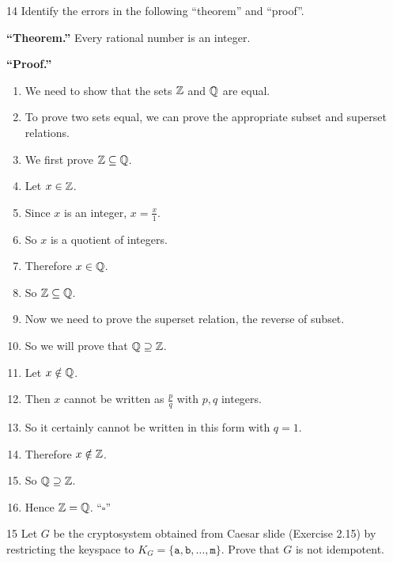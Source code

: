 \begin{exercise}{14}
    Identify the errors in the following ``theorem'' and ``proof''.

    \textbf{``Theorem.''} Every rational number is an integer.

    \textbf{``Proof.''}
    \begin{enumerate}
        \item We need to show that the sets $\mathbb{Z}$ and $\mathbb{Q}$ are equal.
        \item To prove two sets equal, we can prove the appropriate subset and
              superset relations.
        \item We first prove $\mathbb{Z}\subseteq\mathbb{Q}$.
        \item Let $x\in\mathbb{Z}$.
        \item Since $x$ is an integer, $x=\frac x1$.
        \item So $x$ is a quotient of integers.
        \item Therefore $x\in\mathbb{Q}$.
        \item So $\mathbb{Z}\subseteq\mathbb{Q}$.
        \item Now we need to prove the superset relation, the reverse of subset.
        \item So we will prove that $\mathbb{Q}\supseteq\mathbb{Z}$.
        \item Let $x\notin\mathbb{Q}$.
        \item Then $x$ cannot be written as $\frac pq$ with $p,q$ integers.
        \item So it certainly cannot be written in this form with $q=1$.
        \item Therefore $x\notin\mathbb{Z}$.
        \item So $\mathbb{Q}\supseteq\mathbb{Z}$.
        \item Hence $\mathbb{Z}=\mathbb{Q}$. ``$\square$''
    \end{enumerate}
\end{exercise}
\begin{solbox}
\begin{solution}

\end{solution}
\end{solbox}

\begin{exercise}{15}
    Let $G$ be the cryptosystem obtained from Caesar slide (Exercise 2.15) by
    restricting the keyspace to $K_G=\{\mathtt a,\mathtt b,\dots,\mathtt m\}$.
    Prove that $G$ is not idempotent.
\end{exercise}
\begin{solbox}
\begin{solution}

\end{solution}
\end{solbox}

